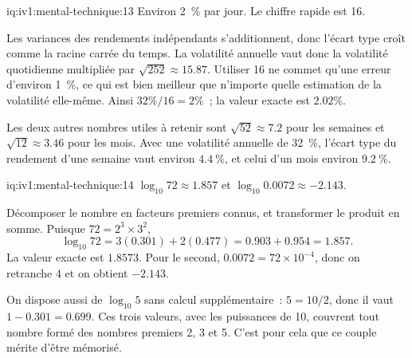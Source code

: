 \begin{solution}{iq:iv1:mental-technique:13}
Environ 2~\% par jour. Le chiffre rapide est 16.

Les variances des rendements indépendants s'additionnent, donc l'écart type croît comme la racine carrée du temps. La volatilité annuelle vaut donc la volatilité quotidienne multipliée par $\sqrt{252} \approx 15.87$. Utiliser 16 ne commet qu'une erreur d'environ 1~\%, ce qui est bien meilleur que n'importe quelle estimation de la volatilité elle-même. Ainsi $32\% / 16 = 2\%$~; la valeur exacte est $2.02\%$.

Les deux autres nombres utiles à retenir sont $\sqrt{52} \approx 7.2$ pour les semaines et $\sqrt{12} \approx 3.46$ pour les mois. Avec une volatilité annuelle de 32~\%, l'écart type du rendement d'une semaine vaut environ $4.4~\%$, et celui d'un mois environ $9.2~\%$.

\end{solution}

\begin{solution}{iq:iv1:mental-technique:14}
$\log_{10} 72 \approx 1.857$ et $\log_{10} 0.0072 \approx -2.143$.

Décomposer le nombre en facteurs premiers connus, et transformer le produit en somme. Puisque $72 = 2^3 \times 3^2$,
\[
\log_{10} 72 = 3(0.301) + 2(0.477) = 0.903 + 0.954 = 1.857.
\]
La valeur exacte est $1.8573$. Pour le second, $0.0072 = 72 \times 10^{-4}$, donc on retranche 4 et on obtient $-2.143$.

On dispose aussi de $\log_{10} 5$ sans calcul supplémentaire~: $5 = 10/2$, donc il vaut $1 - 0.301 = 0.699$. Ces trois valeurs, avec les puissances de 10, couvrent tout nombre formé des nombres premiers 2, 3 et 5. C'est pour cela que ce couple mérite d'être mémorisé.

\end{solution}

